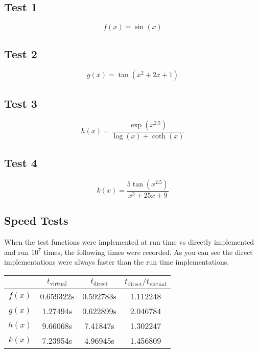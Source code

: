 \documentclass[11pt]{article}
\begin{document}
\subsection*{Test 1}           

\begin{equation}
  f(x) = \sin(x)
\end{equation}

\subsection*{Test 2}           
\begin{equation}
  g(x) = \tan(x^2 + 2x + 1)
\end{equation}

\subsection*{Test 3}           
\begin{equation}
  h(x) = \frac{\exp(x^{2.5})}{\log(x) + \coth(x)} 
\end{equation}

\subsection*{Test 4}           
\begin{equation}
  k(x) = \frac{5\tan(x^{2.5})}{x^3 + 25x + 9} 
\end{equation}

\subsection*{Speed Tests}

When the test functions were implemented at run time vs directly implemented and run $10^7$ times, the following times were recorded. As you can see the direct implementations were always faster than the run time implementations.

\begin{table}[h]
  \centering 
  \begin{tabular}{c|ccc}
           & $t_\textrm{virtual}$  & $t_\textrm{direct}$ & $t_\textrm{direct}/t_\textrm{virtual}$  \\
    \hline
    $f(x)$ & 0.659322s & 0.592783s & 1.112248 \\
    $g(x)$ & 1.27494s  & 0.622899s & 2.046784 \\
    $h(x)$ & 9.66068s  & 7.41847s  & 1.302247 \\
    $k(x)$ & 7.23954s  & 4.96945s  & 1.456809
  \end{tabular}
\end{table}
\end{document}

